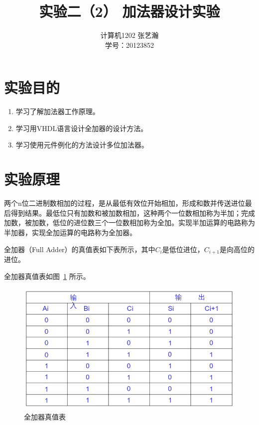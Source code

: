 \documentclass{article}
\begin{document}
\begin{CJK*}{UTF8}{gbsn}
\CJKtilde

\title{实验二（2） 加法器设计实验}

\author{计算机1202 张艺瀚\\学号：20123852}
\maketitle

\section{实验目的}
\begin{enumerate}
\item 学习了解加法器工作原理。
\item 学习用VHDL语言设计全加器的设计方法。
\item 学习使用元件例化的方法设计多位加法器。
\end{enumerate}

\section{实验原理}
两个n位二进制数相加的过程，是从最低有效位开始相加，形成和数并传送进位最后得到结果。最低位只有加数和被加数相加，这种两个一位数相加称为半加；完成加数，被加数，低位的进位数三个一位数相加称为全加。实现半加运算的电路称为半加器，实现全加运算的电路称为全加器。

全加器（Full Adder）的真值表如下表所示，其中$C_i$是低位进位，$C_{i+1}$是向高位的进位。

全加器真值表如图~\ref{fig: true} 所示。
\begin{center}
\begin{figure}[h!]
\includegraphics[width=\textwidth]{true.jpg}
\caption{全加器真值表}
\label{fig: true}
\end{figure}
\end{center}


\end{CJK*}
\end{document}
